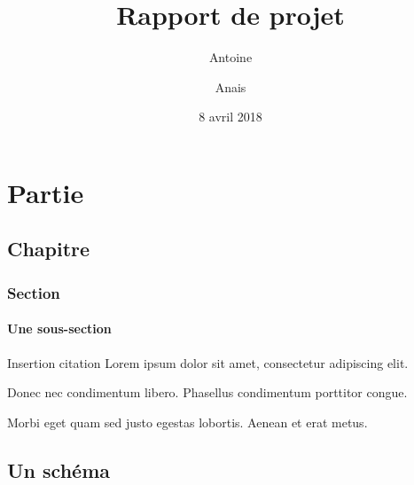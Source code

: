\documentclass{report}
\title{Rapport de projet}
\author{Antoine \bsc{Aubay}}
\author{Anais \bsc{Kayaturan}}
\date{8 avril 2018}
\begin{document}
	
\maketitle

\part{Partie}
\chapter{Chapitre}
\section{Section}
\subsection{Une sous-section}
Insertion citation \cite{dleeg}
Lorem ipsum dolor sit amet, consectetur adipiscing elit.

Donec nec condimentum libero. Phasellus condimentum porttitor congue.

Morbi eget quam sed justo egestas lobortis. Aenean et erat metus.


\appendix
\chapter{Un schéma}




\end{document}
